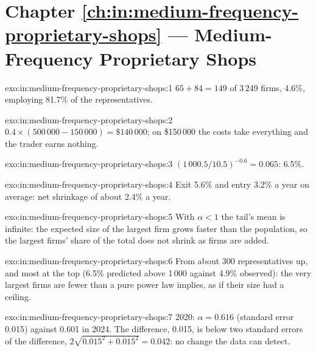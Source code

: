 \section*{Chapter \ref{ch:in:medium-frequency-proprietary-shops} --- Medium-Frequency Proprietary Shops}

\begin{solution}{exo:in:medium-frequency-proprietary-shops:1}
$65+84=149$ of 3\,249 firms, 4.6\%, employing 81.7\% of the representatives.
\end{solution}

\begin{solution}{exo:in:medium-frequency-proprietary-shops:2}
$0.4\times(500\,000-150\,000)=\$140\,000$; on \$150\,000 the costs take everything and the trader earns nothing.
\end{solution}

\begin{solution}{exo:in:medium-frequency-proprietary-shops:3}
$(1\,000.5/10.5)^{-0.6}=0.065$: 6.5\%.
\end{solution}

\begin{solution}{exo:in:medium-frequency-proprietary-shops:4}
Exit 5.6\% and entry 3.2\% a year on average: net shrinkage of about 2.4\% a year.
\end{solution}

\begin{solution}{exo:in:medium-frequency-proprietary-shops:5}
With $\alpha<1$ the tail's mean is infinite: the expected size of the largest firm grows faster than the population,
so the largest firms' share of the total does not shrink as firms are added.
\end{solution}

\begin{solution}{exo:in:medium-frequency-proprietary-shops:6}
From about 300 representatives up, and most at the top (6.5\% predicted above 1\,000 against 4.9\% observed): the very
largest firms are fewer than a pure power law implies, as if their size had a ceiling.
\end{solution}

\begin{solution}{exo:in:medium-frequency-proprietary-shops:7}
2020: $\alpha=0.616$ (standard error 0.015) against 0.601 in 2024. The difference, 0.015, is below two standard errors of
the difference, $2\sqrt{0.015^2+0.015^2}=0.042$: no change the data can detect.
\end{solution}

